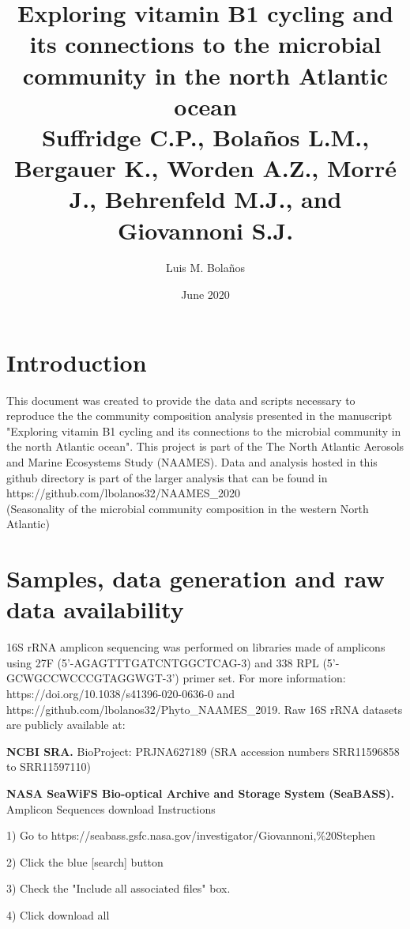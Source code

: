 \documentclass{article}
\begin{document}
\sloppy

\title{%
  Exploring vitamin B1 cycling and its connections to the microbial community in the north Atlantic ocean \\
  \large Suffridge C.P., Bolaños L.M., Bergauer K., Worden A.Z., Morré J., Behrenfeld M.J., and Giovannoni S.J.}

\author{Luis M. Bola\~nos}
\date{June 2020}
\maketitle

\tableofcontents

\section{Introduction}

This document was created to provide the data and scripts necessary to reproduce the the community composition analysis presented in the manuscript "Exploring vitamin B1 cycling and its connections to the microbial community in the north Atlantic ocean". This project is part of the The North Atlantic Aerosols and Marine Ecosystems Study (NAAMES). Data and analysis hosted in this github directory is part of the larger analysis that can be found in https://github.com/lbolanos32/NAAMES\_2020\\ (Seasonality of the microbial community composition in the western North Atlantic)


\section{Samples, data generation and raw data availability}\sloppy

16S rRNA amplicon sequencing was performed on libraries made of amplicons using 27F (5'-AGAGTTTGATCNTGGCTCAG-3) and 338 RPL (5'- GCWGCCWCCCGTAGGWGT-3') primer set. For more information: https://doi.org/10.1038/s41396-020-0636-0 and https://github.com/lbolanos32/Phyto\_NAAMES\_2019. Raw 16S rRNA datasets are publicly available at:

\begin{description}\sloppy

\item[$-$] \textbf{NCBI SRA.} BioProject: PRJNA627189 (SRA accession numbers SRR11596858 to SRR11597110)

\item[$-$] \textbf {NASA SeaWiFS Bio-optical Archive and Storage System (SeaBASS).} 
Amplicon Sequences download Instructions

1) Go to https://seabass.gsfc.nasa.gov/investigator/Giovannoni,\%20Stephen

2) Click the blue [search] button

3) Check the "Include all associated files" box.

4) Click download all

\end{description}
\end{document}
